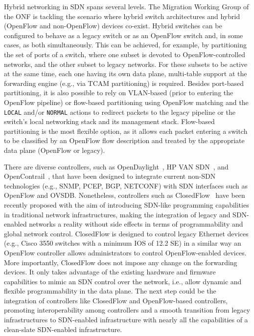 Hybrid networking in SDN spans several levels. The Migration Working Group of the ONF is tackling the scenario where hybrid switch architectures and hybrid (OpenFlow and non-OpenFlow) devices 
co-exist. Hybrid switches can be configured to behave as a legacy switch or as an OpenFlow switch and, in some 
cases, as both simultaneously. This can be achieved, for example, by partitioning the set of ports of a switch, 
where one subset is devoted to OpenFlow-controlled networks, and the other subset to legacy networks. For these 
subsets to be active at the same time, each one having its own data plane, multi-table support at the forwarding 
engine (e.g., via TCAM partitioning) is required. Besides port-based partitioning, it is also possible to rely 
on VLAN-based (prior to entering the OpenFlow pipeline) or flow-based partitioning using OpenFlow matching and 
the \texttt{LOCAL} and/or \texttt{NORMAL} actions to redirect packets to the legacy pipeline or the switch's 
local networking stack and its management stack. Flow-based partitioning is the most flexible option, as it 
allows each packet entering a switch to be classified by an OpenFlow flow description and treated by the 
appropriate data plane (OpenFlow or legacy).

There are diverse controllers, such as OpenDaylight~\cite{opendaylight2013}, HP VAN SDN~\cite{hp2013-1}, and OpenContrail~\cite{junipernetworks2013-1}, that have been designed to integrate current non-SDN technologies (e.g., SNMP, PCEP, BGP, NETCONF) with SDN interfaces such as OpenFlow and OVSDB.
Nonetheless, controllers such as ClosedFlow~\cite{Hand2014_4} have been recently proposed with the aim of introducing SDN-like programming capabilities in traditional network infrastructures, making the integration of legacy and SDN-enabled networks a reality without side effects in terms of programmability and global network control.
ClosedFlow is designed to control legacy Ethernet devices (e.g., Cisco 3550 switches with a minimum IOS of 12.2 SE) in a similar way an OpenFlow controller allows administrators to control OpenFlow-enabled devices.
More importantly, ClosedFlow does not impose any change on the forwarding devices. 
It only takes advantage of the existing hardware and firmware capabilities to mimic an SDN control over the network, i.e., allow dynamic and flexible programmability in the data plane.
The next step could be the integration of controllers like ClosedFlow and OpenFlow-based controllers, promoting interoperability among controllers and a smooth transition from legacy infrastructures to SDN-enabled infrastructure with nearly all the capabilities of a clean-slate SDN-enabled infrastructure.

